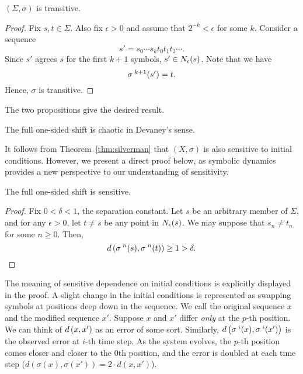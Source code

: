 \documentclass[10pt,twoside]{book}
\begin{document}
\begin{proposition}
  $(\Sigma, \sigma)$ is transitive. 
  \begin{proof}
    Fix $s,t \in \Sigma$.
    Also fix $\epsilon > 0$ and assume that $2^{-k} < \epsilon$ for some $k$.
    Consider a sequence
    \begin{equation*}
      s' = s_0 \cdots s_k t_0 t_1 t_2 \cdots.
    \end{equation*}
    Since $s'$ agrees $s$ for the first $k+1$ symbols, $s' \in N_{\epsilon}(s)$.
    Note that we have
    \begin{equation*}
      \sigma^{\;k+1}(s') = t.
    \end{equation*}
    Hence, $\sigma$ is transitive.
  \end{proof}
\end{proposition}
The two propositions give the desired result.
\begin{theorem}
  The full one-sided shift is chaotic in Devaney's sense.
\end{theorem}
It follows from Theorem~\ref{thm:silverman} that $(X, \sigma)$ is also sensitive to initial conditions.
However, we present a direct proof below, as symbolic dynamics provides a new perspective to our understanding of sensitivity.
\begin{proposition}
  The full one-sided shift is sensitive.
  \begin{proof}
    Fix $0 < \delta < 1$, the separation constant.
    Let $s$ be an arbitrary member of $\Sigma$, and for any $\epsilon > 0$, let $t \neq s$ be any point in $N_{\epsilon}(s)$.
    We may suppose that $s_n \neq t_n$ for some $n \geq 0$.
    Then,
    \begin{equation*}
      d\left( \sigma^{\;n}(s), \sigma^{\;n}(t) \right) \geq 1 > \delta.
    \end{equation*}
  \end{proof}
\end{proposition}
The meaning of sensitive dependence on initial conditions is explicitly displayed in the proof.
A slight change in the initial conditions is represented as swapping symbols at positions deep down in the sequence.
We call the original sequence $x$ and the modified sequence $x'$.
Suppose $x$ and $x'$ differ \textit{only} at the $p$-th position.
We can think of $d\left( x, x' \right)$ as an error of some sort.
Similarly, $d\left( \sigma^{\;i}(x), \sigma^{\;i}(x') \right)$ is the observed error at $i$-th time step.
As the system evolves, the $p$-th position comes closer and closer to the 0th position, and the error is doubled at each time step ($d(\sigma(x), \sigma(x')) = 2 \cdot d(x, x')$).
\end{document}
